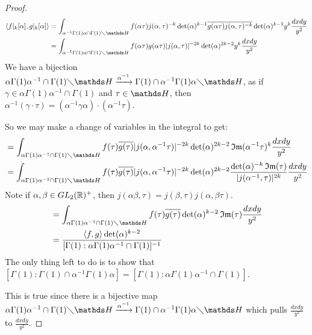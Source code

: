 \documentclass[10pt,a4paper]{article}
\begin{document}
\begin{proof}
  \begin{align*}
    \angle{f|_k[\alpha], g|_k[\alpha]} &= \int_{\alpha^{-1}\Gamma(1)\alpha \cap \Gamma(1)\diagdown \H}f(\alpha\tau)j(\alpha,\tau)^{-k}\det(\alpha)^{k-1}\overline{g(\alpha\tau)j(\alpha,\tau)^{-k}}\det(\alpha)^{k-1}y^k \frac{dxdy}{y^2}\\
    &=\int_{\alpha^{-1}\Gamma(1)\alpha \cap \Gamma(1)\diagdown \H} f(\alpha\tau)g(\alpha\tau)|j(\alpha,\tau)|^{-2k}\det(\alpha)^{2k-2}y^k\frac{dxdy}{y^2}\\
  \end{align*}
  We have a bijection $\alpha\Gamma(1)\alpha^{-1}\cap \Gamma(1)\diagdown \H \xrightarrow{\alpha^{-1}} \Gamma(1)\cap\alpha^{-1}\Gamma(1)\alpha \diagdown \H$, as if $\gamma \in \alpha\Gamma(1)\alpha^{-1}\cap \Gamma(1)$ and $\tau \in \H$, then $\alpha^{-1}(\gamma\cdot \tau) = (\alpha^{-1}\gamma \alpha)\cdot(\alpha^{-1}\tau)$.

  So we may make a change of variables in the integral to get:
  \begin{align*}
    &=\int_{\alpha\Gamma(1)\alpha^{-1} \cap \Gamma(1)\diagdown \H}f(\tau)\overline{g(\tau)}|j(\alpha,\alpha^{-1}\tau)|^{-2k}\det(\alpha)^{2k-2}\Im(\alpha^{-1}\tau)^k \frac{dxdy}{y^2}\\
    &=\int_{\alpha\Gamma(1)\alpha^{-1} \cap \Gamma(1)\diagdown \H}f(\tau)\overline{g(\tau)}|j(\alpha,\alpha^{-1}\tau)|^{-2k}\det(\alpha)^{2k-2} \frac{\det(\alpha)^{-k}\Im(\tau)}{|j(\alpha^{-1}, \tau)|^{2k}}\frac{dxdy}{y^2}
  \end{align*}
  Note if $\alpha, \beta \in GL_2(\mathbb{R})^+$, then $j(\alpha\beta, \tau) = j(\beta,\tau)j(\alpha,\beta\tau)$.
  \begin{align*}
    &= \int_{\alpha\Gamma(1)\alpha^{-1} \cap \Gamma(1)\diagdown \H}f(\tau)\overline{g(\tau)}\det(\alpha)^{k-2}\Im(\tau)\frac{dxdy}{y^2}\\
    &= \frac{\angle{f,g}\det(\alpha)^{k-2}}{[\Gamma(1):\alpha\Gamma(1)\alpha^{-1}\cap \Gamma(1)]^{-1}}
  \end{align*}
  The only thing left to do is to show that $[\Gamma(1):\Gamma(1)\cap\alpha^{-1}\Gamma(1)\alpha] = [\Gamma(1):\alpha\Gamma(1)\alpha^{-1}\cap\Gamma(1)]$.

  This is true since there is a bijective map  $\alpha\Gamma(1)\alpha^{-1}\cap \Gamma(1)\diagdown \H \xrightarrow{\alpha^{-1}} \Gamma(1)\cap\alpha^{-1}\Gamma(1)\alpha \diagdown \H$ which pulls $\frac{dxdy}{y^2}$ to $\frac{dxdy}{y^2}$.


\end{proof}
\end{document}
